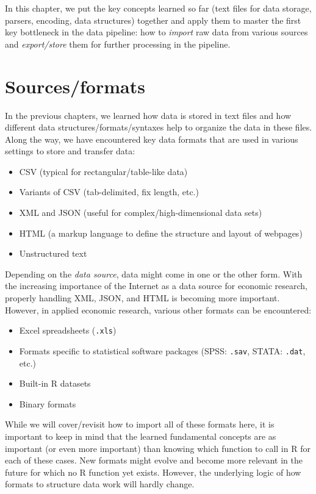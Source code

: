 \documentclass[
  12pt,
]{style/krantz}
\providecommand{\tightlist}{%
  \setlength{\itemsep}{0pt}\setlength{\parskip}{0pt}}
\begin{document}
In this chapter, we put the key concepts learned so far (text files for data storage, parsers, encoding, data structures) together and apply them to master the first key bottleneck in the data pipeline: how to \emph{import} raw data from various sources and \emph{export/store} them for further processing in the pipeline.

\hypertarget{sourcesformats}{%
\section{Sources/formats}\label{sourcesformats}}

In the previous chapters, we learned how data is stored in text files and how different data structures/formats/syntaxes help to organize the data in these files. Along the way, we have encountered key data formats that are used in various settings to store and transfer data:

\begin{itemize}
\tightlist
\item
  CSV (typical for rectangular/table-like data)
\item
  Variants of CSV (tab-delimited, fix length, etc.)
\item
  XML and JSON (useful for complex/high-dimensional data sets)
\item
  HTML (a markup language to define the structure and layout of webpages)
\item
  Unstructured text
\end{itemize}

Depending on the \emph{data source}, data might come in one or the other form. With the increasing importance of the Internet as a data source for economic research, properly handling XML, JSON, and HTML is becoming more important. However, in applied economic research, various other formats can be encountered:

\begin{itemize}
\tightlist
\item
  Excel spreadsheets (\texttt{.xls})
\item
  Formats specific to statistical software packages (SPSS: \texttt{.sav}, STATA: \texttt{.dat}, etc.)
\item
  Built-in R datasets
\item
  Binary formats
\end{itemize}

While we will cover/revisit how to import all of these formats here, it is important to keep in mind that the learned fundamental concepts are as important (or even more important) than knowing which function to call in R for each of these cases. New formats might evolve and become more relevant in the future for which no R function yet exists. However, the underlying logic of how formats to structure data work will hardly change.
\end{document}
